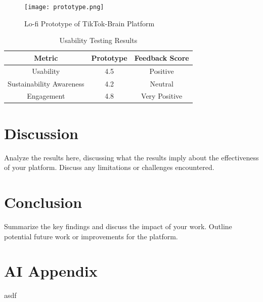 \documentclass{article}
\begin{document}
\begin{figure}[H]
    \centering
    \texttt{[image: prototype.png]} %
    \caption{Lo-fi Prototype of TikTok-Brain Platform}
    \label{fig:prototype}
\end{figure}

\begin{table}[H]
    \centering
    \begin{tabular}{|c|c|c|}
        \hline
        Metric & Prototype & Feedback Score \\
        \hline
        Usability & 4.5 & Positive \\
        Sustainability Awareness & 4.2 & Neutral \\
        Engagement & 4.8 & Very Positive \\
        \hline
    \end{tabular}
    \caption{Usability Testing Results}
    \label{tab:results}
\end{table}

\section{Discussion}
Analyze the results here, discussing what the results imply about the effectiveness of your platform. Discuss any limitations or challenges encountered.

\section{Conclusion}
Summarize the key findings and discuss the impact of your work. Outline potential future work or improvements for the platform.

\newpage


\newpage

\renewcommand{\thesection}{\Alph{section}}

\appendix

\section{AI Appendix}
asdf
\end{document}
